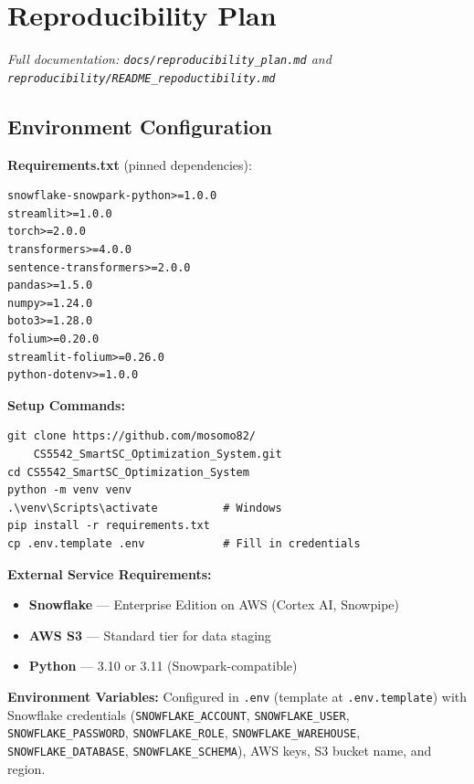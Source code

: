 \documentclass[14.5pt,letterpaper]{article}
\begin{document}
\newpage
\section{Reproducibility Plan}
\label{app:reproducibility}

\noindent\textit{Full documentation: \texttt{docs/reproducibility\_plan.md} and \texttt{reproducibility/README\_repoductibility.md}}

\subsection{Environment Configuration}

\textbf{Requirements.txt} (pinned dependencies):
\begin{lstlisting}[caption={Key dependencies from requirements.txt}]
snowflake-snowpark-python>=1.0.0
streamlit>=1.0.0
torch>=2.0.0
transformers>=4.0.0
sentence-transformers>=2.0.0
pandas>=1.5.0
numpy>=1.24.0
boto3>=1.28.0
folium>=0.20.0
streamlit-folium>=0.26.0
python-dotenv>=1.0.0
\end{lstlisting}

\textbf{Setup Commands:}
\begin{lstlisting}[caption={Environment setup}]
git clone https://github.com/mosomo82/
    CS5542_SmartSC_Optimization_System.git
cd CS5542_SmartSC_Optimization_System
python -m venv venv
.\venv\Scripts\activate          # Windows
pip install -r requirements.txt
cp .env.template .env            # Fill in credentials
\end{lstlisting}

\textbf{External Service Requirements:}
\begin{itemize}
    \item \textbf{Snowflake} --- Enterprise Edition on AWS (Cortex AI, Snowpipe)
    \item \textbf{AWS S3} --- Standard tier for data staging
    \item \textbf{Python} --- 3.10 or 3.11 (Snowpark-compatible)
\end{itemize}

\textbf{Environment Variables:} Configured in \texttt{.env} (template at \texttt{.env.template}) with Snowflake credentials (\texttt{SNOWFLAKE\_ACCOUNT}, \texttt{SNOWFLAKE\_USER}, \texttt{SNOWFLAKE\_PASSWORD}, \texttt{SNOWFLAKE\_ROLE}, \texttt{SNOWFLAKE\_WAREHOUSE}, \texttt{SNOWFLAKE\_DATABASE}, \texttt{SNOWFLAKE\_SCHEMA}), AWS keys, S3 bucket name, and region.
\end{document}
